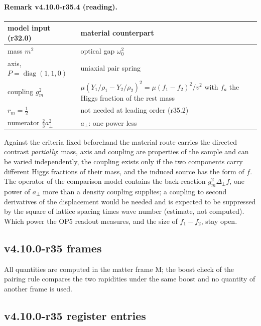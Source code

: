 \paragraph{Remark v4.10.0-r35.4 (reading).}
\begin{center}
\small
\begin{tabular}{@{}>{\raggedright\arraybackslash}p{}>{\raggedright\arraybackslash}p{}@{}}
\toprule
model input (r32.0) & material counterpart\\
\midrule
mass \(m^2\) & optical gap \(\omega_0^2\)\\
axis, \(P=\operatorname{diag}(1,1,0)\) & uniaxial pair spring\\
coupling \(g_m^2\) & \(\mu(Y_1/\rho_1-Y_2/\rho_2)^2=\mu(f_1-f_2)^2/v^2\) with \(f_a\) the Higgs fraction of the rest mass\\
\(r_m=\tfrac12\) & not needed at leading order (r35.2)\\
numerator \(\tfrac23a_\perp^2\) & \(a_\perp\): one power less\\
\bottomrule
\end{tabular}
\end{center}
Against the criteria fixed beforehand the material route carries the directed contrast \emph{partially}: mass, axis and coupling are properties
of the sample and can be varied independently, the coupling exists only if the two components carry different Higgs fractions of their mass,
and the induced source has the form of \(f\).  The operator of the comparison model contains the back-reaction \(g_m^2\Delta_\perp f\), one power of
\(a_\perp\) more than a density coupling supplies; a coupling to second derivatives of the displacement would be needed and is expected to be
suppressed by the square of lattice spacing times wave number (estimate, not computed).  Which power the OP5 readout measures, and the size of
\(f_1-f_2\), stay open.

\subsection*{v4.10.0-r35 frames}
\label{subsec:v4100-r35-frames}

All quantities are computed in the matter frame M; the boost check of the pairing rule compares the two rapidities under the same boost and
no quantity of another frame is used.

\subsection*{v4.10.0-r35 register entries}
\label{subsec:v4100-r35-register}

